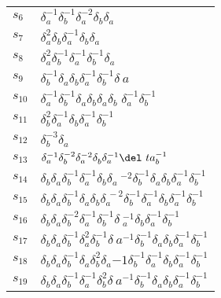 \documentclass{article}
\begin{document}
\begin{center}
\begin{tabular}{ll}
$s_{6}$ & $\delta_a^{-1}\delta_b^{-1}\delta_a^{-2}\delta_b^{}\delta_a^{}$ \\
$s_{7}$ & $\delta_a^{2}\delta_b^{}\delta_a^{-1}\delta_b^{}\delta_a^{}$ \\
$s_{8}$ & $\delta_a^{2}\delta_b^{-1}\delta_a^{-1}\delta_b^{-1}\delta_a^{}$ \\
$s_{9}$ & $\delta_b^{-1}\delta_a^{}\delta_b^{}\delta_a^{-1}\delta_b^{-1}\delta_\
a^{}$ \\
$s_{10}$ & $\delta_a^{-1}\delta_b^{-1}\delta_a^{}\delta_b^{}\delta_a^{}\delta_b\
^{}\delta_a^{-1}\delta_b^{-1}$ \\
$s_{11}$ & $\delta_b^{2}\delta_a^{-1}\delta_b^{}\delta_a^{-1}\delta_b^{-1}$ \\
$s_{12}$ & $\delta_b^{-3}\delta_a^{}$ \\
$s_{13}$ & $\delta_a^{-1}\delta_b^{-2}\delta_a^{-2}\delta_b^{}\delta_a^{-1}\del\
ta_b^{-1}$ \\
$s_{14}$ & $\delta_b^{}\delta_a^{}\delta_b^{-1}\delta_a^{-1}\delta_b^{}\delta_a\
^{-2}\delta_b^{-1}\delta_a^{}\delta_b^{}\delta_a^{-1}\delta_b^{-1}$ \\
$s_{15}$ & $\delta_b^{}\delta_a^{}\delta_b^{-1}\delta_a^{}\delta_b^{}\delta_a^{\
-2}\delta_b^{-1}\delta_a^{-1}\delta_b^{}\delta_a^{-1}\delta_b^{-1}$ \\
$s_{16}$ & $\delta_b^{}\delta_a^{}\delta_b^{-2}\delta_a^{-1}\delta_b^{-1}\delta\
_a^{-1}\delta_b^{}\delta_a^{-1}\delta_b^{-1}$ \\
$s_{17}$ & $\delta_b^{}\delta_a^{}\delta_b^{-1}\delta_a^{2}\delta_b^{-1}\delta_\
a^{-1}\delta_b^{-1}\delta_a^{}\delta_b^{}\delta_a^{-1}\delta_b^{-1}$ \\
$s_{18}$ & $\delta_b^{}\delta_a^{}\delta_b^{-1}\delta_a^{}\delta_b^{2}\delta_a^\
{-1}\delta_b^{-1}\delta_a^{-1}\delta_b^{}\delta_a^{-1}\delta_b^{-1}$ \\
$s_{19}$ & $\delta_b^{}\delta_a^{}\delta_b^{-1}\delta_a^{-1}\delta_b^{2}\delta_\
a^{-1}\delta_b^{-1}\delta_a^{}\delta_b^{}\delta_a^{-1}\delta_b^{-1}$ \\
\bottomrule
\end{tabular}
\end{center}

\thispagestyle{empty}
\end{document}
